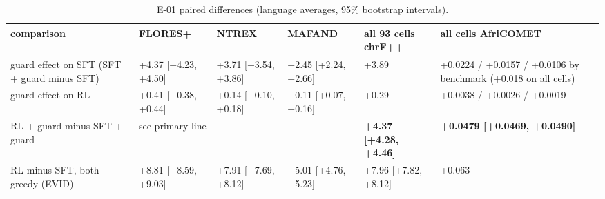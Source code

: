 \begin{table}[htbp]
\centering\footnotesize
\setlength{\tabcolsep}{4pt}
\caption{E-01 paired differences (language averages, 95\% bootstrap intervals).}\label{tab:e01-diff}
\begin{adjustbox}{max width=\linewidth}\begin{tabular}{@{}llllll@{}}
\toprule
comparison & FLORES+ & NTREX & MAFAND & all 93 cells chrF++ & all cells AfriCOMET \\
\midrule
guard effect on SFT (SFT + guard minus SFT) & +4.37 [+4.23, +4.50] & +3.71 [+3.54, +3.86] & +2.45 [+2.24, +2.66] & +3.89 & +0.0224 / +0.0157 / +0.0106 by benchmark (+0.018 on all cells) \\
guard effect on RL & +0.41 [+0.38, +0.44] & +0.14 [+0.10, +0.18] & +0.11 [+0.07, +0.16] & +0.29 & +0.0038 / +0.0026 / +0.0019 \\
RL + guard minus SFT + guard & see primary line &  &  & \textbf{+4.37 [+4.28, +4.46]} & \textbf{+0.0479 [+0.0469, +0.0490]} \\
RL minus SFT, both greedy (EVID) & +8.81 [+8.59, +9.03] & +7.91 [+7.69, +8.12] & +5.01 [+4.76, +5.23] & +7.96 [+7.82, +8.12] & +0.063 \\
\bottomrule
\end{tabular}\end{adjustbox}
\end{table}